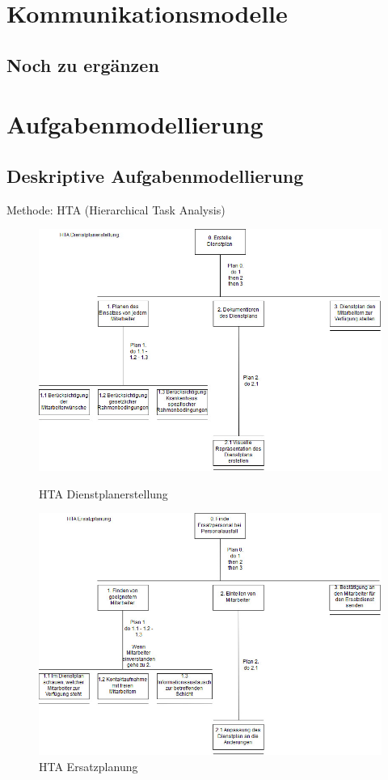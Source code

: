 \documentclass[10pt,a4paper]{article}
\begin{document}
\section{Kommunikationsmodelle}
\subsection{Noch zu ergänzen}
\section{Aufgabenmodellierung}
\subsection{Deskriptive Aufgabenmodellierung}
Methode: HTA (Hierarchical Task Analysis)
\begin{figure}[H]
\includegraphics[scale=0.4]{Bilder/Dienstplanerstellung.jpg}{\centering}
\caption{HTA Dienstplanerstellung}
\vspace{3cm}
\includegraphics[scale=0.4]{Bilder/Ersatzplanung.jpg}{\centering}
\caption{HTA Ersatzplanung}
\end{figure}
\end{document}
